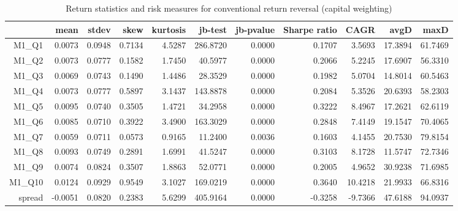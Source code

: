 \begin{table}[ht]
\centering
\begin{tabular}{rrrrrrrrrrr}
  \hline
 & mean & stdev & skew & kurtosis & jb-test & jb-pvalue & Sharpe ratio & CAGR & avgD & maxD \\ 
  \hline
M1\_Q1 & 0.0073 & 0.0948 & 0.7134 & 4.5287 & 286.8720 & 0.0000 & 0.1707 & 3.5693 & 17.3894 & 61.7469 \\ 
  M1\_Q2 & 0.0073 & 0.0777 & 0.1582 & 1.7450 & 40.5977 & 0.0000 & 0.2066 & 5.2245 & 17.6907 & 56.3310 \\ 
  M1\_Q3 & 0.0069 & 0.0743 & 0.1490 & 1.4486 & 28.3529 & 0.0000 & 0.1982 & 5.0704 & 14.8014 & 60.5463 \\ 
  M1\_Q4 & 0.0073 & 0.0777 & 0.5897 & 3.1437 & 143.8878 & 0.0000 & 0.2084 & 5.3526 & 20.6393 & 58.2303 \\ 
  M1\_Q5 & 0.0095 & 0.0740 & 0.3505 & 1.4721 & 34.2958 & 0.0000 & 0.3222 & 8.4967 & 17.2621 & 62.6119 \\ 
  M1\_Q6 & 0.0085 & 0.0710 & 0.3922 & 3.4900 & 163.3029 & 0.0000 & 0.2848 & 7.4149 & 19.1547 & 70.4065 \\ 
  M1\_Q7 & 0.0059 & 0.0711 & 0.0573 & 0.9165 & 11.2400 & 0.0036 & 0.1603 & 4.1455 & 20.7530 & 79.8154 \\ 
  M1\_Q8 & 0.0093 & 0.0749 & 0.2891 & 1.6991 & 41.5247 & 0.0000 & 0.3103 & 8.1728 & 11.5747 & 72.7346 \\ 
  M1\_Q9 & 0.0074 & 0.0824 & 0.3507 & 1.8863 & 52.0771 & 0.0000 & 0.2005 & 4.9652 & 30.9238 & 71.6985 \\ 
  M1\_Q10 & 0.0124 & 0.0929 & 0.9549 & 3.1027 & 169.0219 & 0.0000 & 0.3640 & 10.4218 & 21.9933 & 66.8316 \\ 
  spread & -0.0051 & 0.0820 & 0.2383 & 5.6299 & 405.9164 & 0.0000 & -0.3258 & -9.7366 & 47.6188 & 94.0937 \\ 
   \hline
\end{tabular}
\caption{Return statistics and risk measures for conventional 
                             return reversal (capital weighting)} 
\label{tab:returnRevStats}
\end{table}
